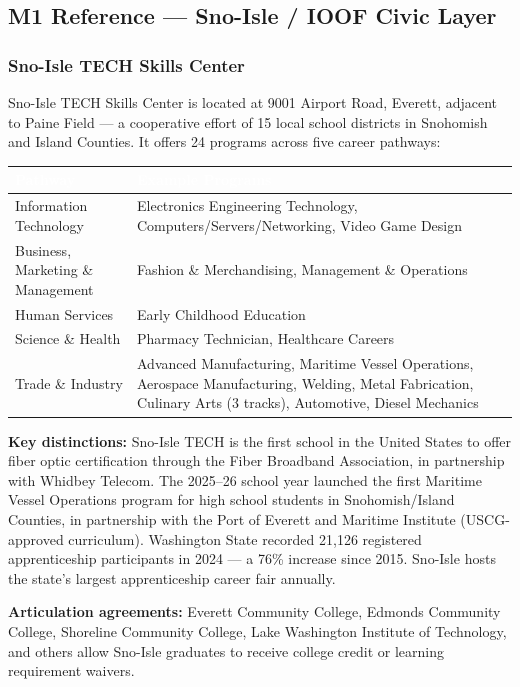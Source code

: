 \documentclass[11pt,letterpaper]{article}
\newcommand{\tableheader}[1]{\textbf{\sffamily\textcolor{white}{#1}}}
\begin{document}
\subsection{M1 Reference --- Sno-Isle / IOOF Civic Layer}

\subsubsection{Sno-Isle TECH Skills Center}

Sno-Isle TECH Skills Center is located at 9001 Airport Road, Everett, adjacent to Paine Field --- a cooperative effort of 15 local school districts in Snohomish and Island Counties. It offers 24 programs across five career pathways:

\begin{center}
\begin{tabularx}{\textwidth}{L{4cm}X}
\toprule
{}
\tableheader{Pathway} & \tableheader{Example Programs} \\
\midrule
Information Technology & Electronics Engineering Technology, Computers/Servers/Networking, Video Game Design \\
Business, Marketing \& Management & Fashion \& Merchandising, Management \& Operations \\
Human Services & Early Childhood Education \\
Science \& Health & Pharmacy Technician, Healthcare Careers \\
Trade \& Industry & Advanced Manufacturing, Maritime Vessel Operations, Aerospace Manufacturing, Welding, Metal Fabrication, Culinary Arts (3 tracks), Automotive, Diesel Mechanics \\
\bottomrule
\end{tabularx}
\end{center}

\textbf{Key distinctions:} Sno-Isle TECH is the first school in the United States to offer fiber optic certification through the Fiber Broadband Association, in partnership with Whidbey Telecom. The 2025--26 school year launched the first Maritime Vessel Operations program for high school students in Snohomish/Island Counties, in partnership with the Port of Everett and Maritime Institute (USCG-approved curriculum). Washington State recorded 21,126 registered apprenticeship participants in 2024 --- a 76\% increase since 2015. Sno-Isle hosts the state's largest apprenticeship career fair annually.

\textbf{Articulation agreements:} Everett Community College, Edmonds Community College, Shoreline Community College, Lake Washington Institute of Technology, and others allow Sno-Isle graduates to receive college credit or learning requirement waivers.
\end{document}
